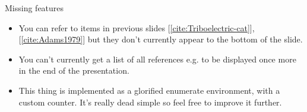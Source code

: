 \documentclass[t,12pt]{beamer}
\newcommand{\slidecite}[1]{[\ref{cite:#1}]}
\begin{document}
\begin{frame}{Missing features}
\begin{itemize}
\item You can refer to items in previous slides \slidecite{Triboelectric-cat}, \slidecite{Adams1979} but they don't currently appear to the bottom of the slide.
\item You can't currently get a list of all references e.g. to be displayed once more in the end of the presentation.
\item This thing is implemented as a glorified enumerate environment, with a custom counter. It's really dead simple so feel free to improve it further.
\end{itemize}

\end{frame}
\end{document}
